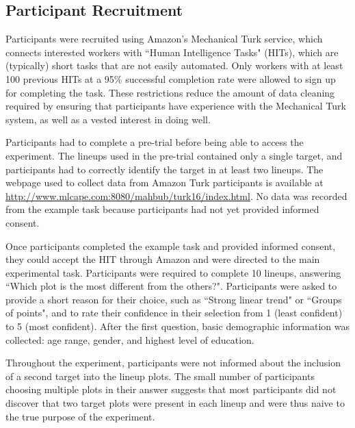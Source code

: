 \documentclass[12pt]{article}\usepackage[]{graphicx}\usepackage[]{color}
\begin{document}

\subsection{Participant Recruitment}
Participants were recruited using Amazon's Mechanical Turk service\citep{amazon}, which connects interested workers with ``Human Intelligence Tasks" (HITs), which are (typically) short tasks that are not easily automated. Only workers with at least 100 previous HITs at a 95\% successful completion rate were allowed to sign up for completing the task. These restrictions reduce the amount of data cleaning required by ensuring that participants have experience with the Mechanical Turk system, as well as a vested interest in doing well. 



Participants had to complete a pre-trial before being able to access the experiment. 
The lineups used in the pre-trial contained only a single target,%
and participants had to correctly identify the target in at least two lineups. %
The webpage used to collect data from Amazon Turk participants is available at \url{http://www.mlcape.com:8080/mahbub/turk16/index.html}. No data was recorded from the example task because participants had not yet provided informed consent. 

Once participants completed the example task and provided informed consent, they could accept the HIT through Amazon and were directed to the main experimental task. 
Participants were required to complete 10 lineups, answering ``Which plot is the most different from the others?". Participants were asked to provide a short reason for their choice, such as ``Strong linear trend" or ``Groups of points", and to rate their confidence in their selection from 1 (least confident) to 5 (most confident). 
After the first question, basic demographic information was collected: age range, gender, and highest level of education. 

Throughout the experiment, participants were not informed about the inclusion of a second target into the lineup plots.  
The small number of participants choosing multiple plots in their answer suggests that most participants did not discover that two target plots were present in each lineup and were thus naive to the true purpose of the experiment.
\end{document}
